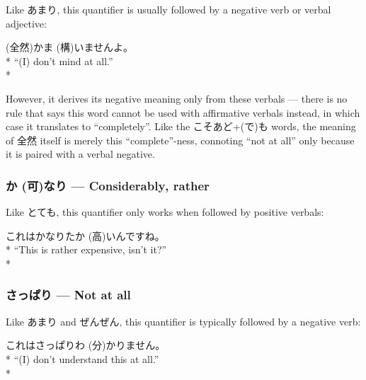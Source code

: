 \documentclass[11pt, b5paper, twoside, openright, onecolumn]{book}
\makeatletter
\newcommand*{\rubystack}[2]{{\relscale{0.5}%
  \begin{tabular}[b]{@{}c@{}}%
    {#1}\\%
   {\textscale{2}{#2}}%
  \end{tabular}}%
}
\DeclareRobustCommand*{\ruby}[2]{%
  \mbox{%
    \setlength{\parskip}{0ex}%
    \BeginAccSupp{method=pdfstringdef,ActualText={#1}}%
      \rubystack{\phantom{#2}}{#1}%
      \llap{%
        \rubystack{#2}{\phantom{#1}}%
      }%
    \EndAccSupp{}%
  }%
}
\renewcommand*{\ruby}[2]{#2 (#1)}%
\newenvironment{exampleblock}{
\setlength{\parindent}{0.6in}
\begin{minipage}[t]{\dimexpr\textwidth-\parindent}}
{\end{minipage}}
\makeatother
\begin{document}
Like あまり‚ this quantifier is usually followed by a negative verb or verbal adjective:

\vspace{0.4cm}
\begin{exampleblock}
\ruby{全然}{}\ruby{構}{かま}いませんよ。 \\* 
“(I) don’t mind at all.” \\* 
\end{exampleblock}
\vspace{0.2cm}

However‚ it derives its negative meaning only from these verbals — there is no rule that says this word cannot be used with affirmative verbals instead‚ in which case it translates to “completely”. Like the こそあど+(で)も words‚ the meaning of 全然 itself is merely this “complete”-ness‚ connoting “not at all” only because it is paired with a verbal negative.

\subsubsection{\ruby{可}{か}なり — Considerably‚ rather}

Like とても‚ this quantifier only works when followed by positive verbals:

\vspace{0.4cm}
\begin{exampleblock}
これはかなり\ruby{高}{たか}いんですね。 \\* 
“This is rather expensive‚ isn’t it?” \\* 
\end{exampleblock}
\subsubsection{さっぱり — Not at all}


Like あまり and ぜんぜん‚ this quantifier is typically followed by a negative verb:

\vspace{0.4cm}
\begin{exampleblock}
これはさっぱり\ruby{分}{わ}かりません。 \\* 
“(I) don’t understand this at all.” \\* 
\end{exampleblock}
\vspace{0.2cm}
\end{document}
